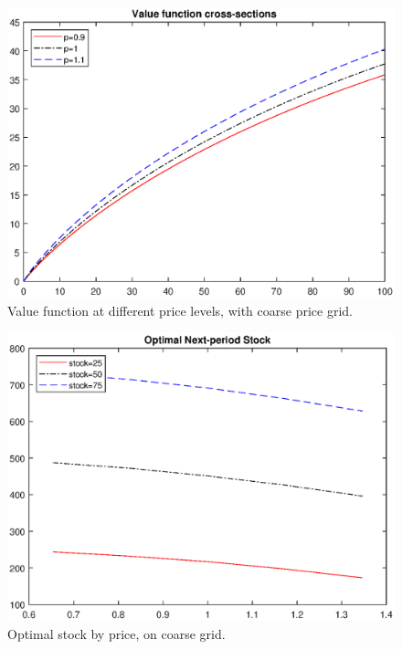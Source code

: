 \documentclass[12pt,a4paper]{article}
\begin{document}
\begin{enumerate}[1.]
\begin{figure}[h]
\includegraphics[width=\textwidth]{value2.eps}\vspace{-3ex}
\caption{Value function at different price levels, with coarse price grid.}
\end{figure}
\begin{figure}[h]
\includegraphics[width=\textwidth]{stock2.eps}\vspace{-3ex}
\caption{Optimal stock by price, on coarse grid.}

\end{figure}
\restoregeometry
\end{enumerate}
\end{document}
